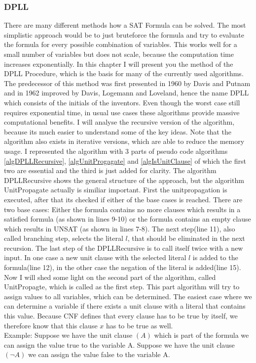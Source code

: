 \subsubsection{DPLL}
There are many different methods how a SAT Formula can be solved. The most simplistic approach would be to just bruteforce the formula and try to evaluate the formula for every possible combination of variables. This works well for a small number of variables but does not scale, because the computation time increases exponentially. In this chapter I will present you the method of the DPLL Procedure, which is the basis for many of the currently used algorithms.
The predecessor of this method was first presented in 1960 by Davis and Putnam and in 1962 improved by Davis, Logemann and Loveland, hence the name DPLL which consists of the initials of the inventors.
Even though the worst case still requires exponential time, in usual use cases these algorithms provide massive computational benefits. I will analyse the recursive version of the algorithm, because its much easier to understand some of the key ideas. Note that the algorithm also exists in iterative versions, which are able to reduce the memory usage.
I represented the algorithm with 3 parts of pseudo code algorithms \ref{algDPLLRecursive}, \ref{algUnitProgagate} and \ref{algIsUnitClause} of which the first two are essential and the third is just added for clarity.
The algorithm DPLLRecursive shows the general structure of the approach, but the algorithm UnitPropagate actually is similiar important.
First the unitpropagation is executed, after that its checked if either of the base cases is reached. There are two base cases: Either the formula contains no more clauses which results in a satisfied formula (as shown in lines 9-10) or the formula contains an empty clause which results in UNSAT (as shown in lines 7-8).
The next step(line 11), also called branching step, selects the literal $l$, that should be eliminated in the next recursion.
The last step of the DPLLRecursive is to call itself twice with a new input. In one case a new unit clause with the selected literal $l$ is added to the formula(line 12), in the other case the negation of the literal is added(line 15).\\
Now I will shed some light on the second part of the algorithm, called UnitPropagte, which is called as the first step.
This part algorithm will try to assign values to all variables, which can be determined. The easiest case where we can determine a variable if there exists a unit clause with a literal that contains this value. Because CNF defines that every clause has to be true by itself, we therefore know that this clause $x$ has to be true as well.\\ Example: Suppose we have the unit clause $(A)$ which is part of the formula we can assign the value true to the variable A. Suppose we have the unit clause $(\lnot A)$ we can assign the value false to the variable A.\\
